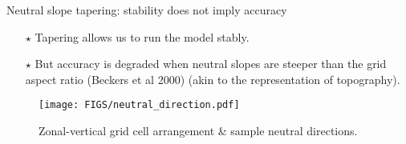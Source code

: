 \documentclass{beamer}
\begin{document}
\begin{frame}{Neutral slope tapering: stability does not imply accuracy}

\begin{itemize}

\item[$\star$] Tapering allows us to run the model stably.

 \item[$\star$] But accuracy is degraded when neutral slopes are steeper than the grid aspect ratio (Beckers et al 2000)
 (akin to the representation of topography).

\end{itemize}


\begin{figure}[ht]
\begin{center}
\texttt{[image: FIGS/neutral\_direction.pdf]}
\caption{Zonal-vertical grid cell arrangement \& sample neutral directions.}
\label{fig:neutral_direction}
\end{center}
\end{figure}

\end{frame}
\end{document}
